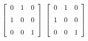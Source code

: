 {$\left[ \begin {array}{ccc} 0&1&0\\\noalign{\medskip}1&0&0
\\\noalign{\medskip}0&0&1\end {array} \right]$ 
}
{$ \left[ \begin {array}{ccc} 0&1&0\\\noalign{\medskip}1&0&0
\\\noalign{\medskip}0&0&1\end {array} \right]$}
